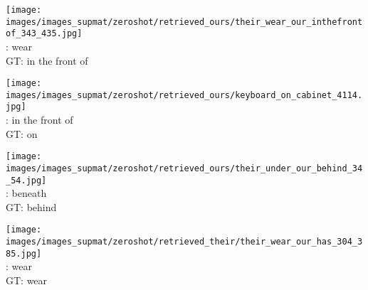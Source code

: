 \documentclass[10pt,twocolumn,letterpaper]{article}
\begin{document}
\begin{figure*}[t]
    \begin{minipage}[t]{0.185\textwidth}
    	\centering
       	\texttt{[image: images/images\_supmat/zeroshot/retrieved\_ours/their\_wear\_our\_inthefrontof\_343\_435.jpg]}\\
		\vspace{0.3ex}       	
       	\cite{Lu16}: wear \\
       	GT: in the front of
       	\vspace{3ex}
    \end{minipage}
    \hspace{0.005\textwidth}
    \begin{minipage}[t]{0.185\textwidth}
    	\centering
       	\texttt{[image: images/images\_supmat/zeroshot/retrieved\_ours/keyboard\_on\_cabinet\_4114.jpg]}\\
       	\vspace{0.3ex}
       	\cite{Lu16}: in the front of \\
       	GT: on
       	\vspace{0.2ex}
    \end{minipage}
    \hspace{0.005\textwidth}
    \begin{minipage}[t]{0.185\textwidth}
       \centering
       \texttt{[image: images/images\_supmat/zeroshot/retrieved\_ours/their\_under\_our\_behind\_34\_54.jpg]}\\
       \vspace{0.3ex}
       \cite{Lu16}: beneath \\
       GT: behind
       \vspace{0.2ex}
    \end{minipage}
    \hspace{0.005\textwidth}
    \begin{minipage}[t]{0.185\textwidth}
    	\centering
       	\texttt{[image: images/images\_supmat/zeroshot/retrieved\_their/their\_wear\_our\_has\_304\_385.jpg]}\\
       	\vspace{0.3ex}
       	\cite{Lu16}: wear \\
       	GT: wear
       	\vspace{0.2ex}

\end{minipage}
\end{figure*}
\end{document}
